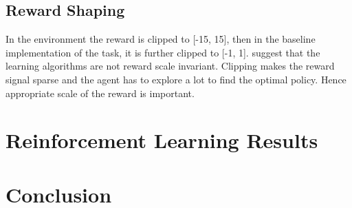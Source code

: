 \documentclass[conference]{IEEEtran}
\begin{document}
\subsection{Reward Shaping}

In the environment the reward is clipped to [-15, 15], then in the baseline implementation of the task, it is further clipped to [-1, 1]. \cite{vanhasseltLearningValuesMany2016} suggest that the learning algorithms are not reward scale invariant. Clipping makes the reward signal sparse and the agent has to explore a lot to find the optimal policy. Hence appropriate scale of the reward is important.

\section{Reinforcement Learning Results}

\section{Conclusion}





\end{document}

